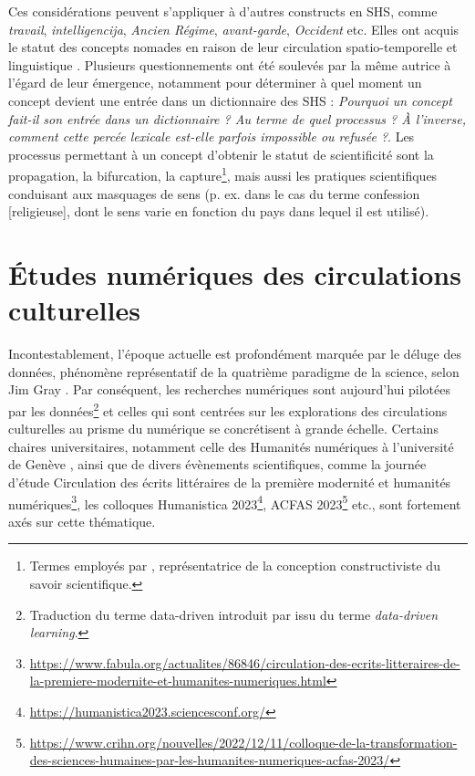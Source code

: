 Ces considérations peuvent s'appliquer à d'autres constructs en SHS, comme \textit{travail}, \textit{intelligencija}, \textit{Ancien Régime}, \textit{avant-garde}, \textit{Occident} etc. Elles ont acquis le statut des concepts \og{}nomades\fg{} en raison de leur circulation spatio-temporelle et linguistique \citep[p. 117]{ghermani2011}. Plusieurs questionnements ont été soulevés par la même autrice à l'égard de leur émergence, notamment pour déterminer à quel moment un concept devient une entrée dans un dictionnaire des \textsc{SHS} : \og{}\textit{Pourquoi un concept fait-il son entrée dans un dictionnaire ? Au terme de quel processus ? À l'inverse, comment cette percée lexicale est-elle parfois impossible ou refusée ?}\fg{}. Les processus permettant à un concept d'obtenir le statut de scientificité sont la propagation, la bifurcation, la capture\footnote{Termes employés par \citet{stengers1987d}, représentatrice de la conception constructiviste du savoir scientifique.}, mais aussi les pratiques scientifiques conduisant aux masquages de sens (p. ex. dans le cas du terme \og{}confession [religieuse]\fg{}, dont le sens varie en fonction du pays dans lequel il est utilisé).



\section{Études numériques des circulations culturelles}
Incontestablement, l'époque actuelle est profondément marquée par le \og{}déluge des données\fg{}, phénomène représentatif de la quatrième paradigme de la science, selon Jim Gray \citep[p.~30]{hey2009jim}. Par conséquent, les recherches numériques sont aujourd'hui \og{}pilotées par les données\fg{}\footnote{Traduction du terme \og{}data-driven\fg{} introduit par \citet{Johns1991ShouldYB} issu du terme \textit{data-driven learning}.} et celles qui sont centrées sur les explorations des circulations culturelles au prisme du numérique se concrétisent à grande échelle.
Certains chaires universitaires, notamment celle des Humanités numériques à l'université de Genève \citep{joyeux2022circulations}, ainsi que de divers évènements scientifiques, comme la journée d'étude \og{}Circulation des écrits littéraires de la première modernité et humanités numériques\fg{}\footnote{\url{https://www.fabula.org/actualites/86846/circulation-des-ecrits-litteraires-de-la-premiere-modernite-et-humanites-numeriques.html}}, les colloques Humanistica 2023\footnote{\url{https://humanistica2023.sciencesconf.org/}}, \textsc{ACFAS} 2023\footnote{\url{https://www.crihn.org/nouvelles/2022/12/11/colloque-de-la-transformation-des-sciences-humaines-par-les-humanites-numeriques-acfas-2023/}} etc., sont fortement axés sur cette thématique. 


